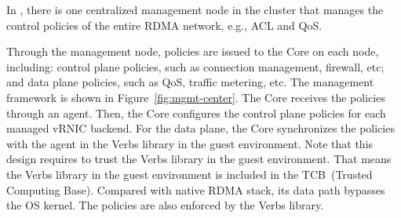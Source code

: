 In \sys, there is one centralized management node in the cluster that manages the control policies of the entire RDMA network, e.g., ACL and QoS.



Through the management node, policies are issued to the \sys Core on each node, including: control plane policies, such as connection management, firewall, etc;  and data plane policies, such as QoS, traffic metering, etc. The management framework is shown in Figure~\ref{fig:mgmt-center}. The \sys Core receives the policies through an agent. Then, the \sys Core configures the control plane policies for each managed vRNIC backend.
For the data plane, the \sys Core synchronizes the policies with the agent in the Verbs library in the guest environment.
Note that this design requires \sys to trust the Verbs library in the guest environment. That means the Verbs library in the guest environment is included in the TCB~(Trusted Computing Base). Compared with native RDMA stack, its data path bypasses the OS kernel. The policies are also enforced by the Verbs library.



